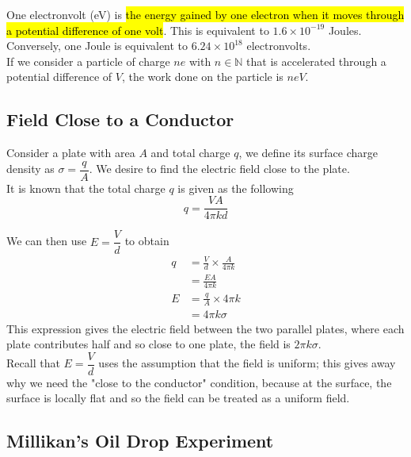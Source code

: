 \documentclass[a4paper,12pt]{article}
\newcommand{\lb}{\\[8pt]}
\begin{document}
One electronvolt (eV) is \hl{the energy gained by one electron when it moves through a potential difference of one volt}. This is equivalent to $1.6 \times 10^{-19}$ Joules.\lb
Conversely, one Joule is equivalent to $6.24 \times 10^{18}$ electronvolts.\lb
If we consider a particle of charge $ne$ with $n\in \mathbb{N}$ that is accelerated through a potential difference of $V$, the work done on the particle is $neV$.

\pagebreak

\subsection{Field Close to a Conductor}

Consider a plate with area $A$ and total charge $q$, we define its surface charge density as $\sigma = \dfrac{q}{A}$. We desire to find the electric field close to the plate.\lb
It is known that the total charge $q$ is given as the following
\begin{equation}\label{eq:charge}
  q = \frac{VA}{4\pi kd}
\end{equation}

We can then use $E = \dfrac{V}{d}$ to obtain
\begin{align*}
  q & = \frac{V}{d}\times\frac{A}{4\pi k} \\
    & = \frac{EA}{4\pi k}                 \\
  E & = \frac{q}{A} \times 4\pi k         \\
    & =  4\pi k\sigma
\end{align*}
This expression gives the electric field between the two parallel plates, where each plate contributes half and so close to one plate, the field is $2\pi k\sigma$.\lb
Recall that $E = \dfrac{V}{d}$ uses the assumption that the field is uniform; this gives away why we need the "close to the conductor" condition, because at the surface, the surface is locally flat and so the field can be treated as a uniform field.

\pagebreak

\subsection{Millikan's Oil Drop Experiment}
\end{document}
